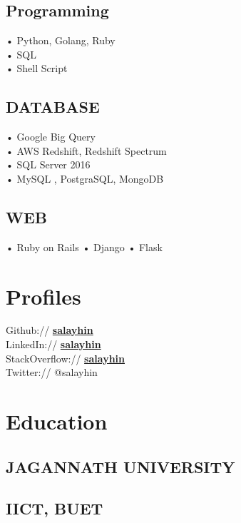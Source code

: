 \documentclass[letterpaper]{deedy-resume} %
\begin{document}
\begin{minipage}[t]{0.33\textwidth}
\sectionspace %

\subsection{Programming}
• Python, Golang, Ruby \\
• SQL \\
• Shell Script\\

\subsection{DATABASE}
• Google Big Query \\
• AWS Redshift, Redshift Spectrum  \\
• SQL Server 2016 \\
• MySQL , PostgraSQL, MongoDB
\sectionspace %

\subsection{WEB}
• Ruby on Rails • Django • Flask

\sectionspace %


\section{Profiles} 
Github:// \href{https://github.com/salayhin}{\bf salayhin} \\
LinkedIn:// \href{https://www.linkedin.com/in/salayhin}{\bf salayhin} \\
StackOverflow:// \href{https://stackoverflow.com/users/717600/sirajus-salayhin}{\bf salayhin} \\
Twitter:// @salayhin
\sectionspace %

\section{Education} 
\subsection{JAGANNATH UNIVERSITY}

\sectionspace %

\subsection{IICT, BUET}


\end{minipage} %
\end{document}
